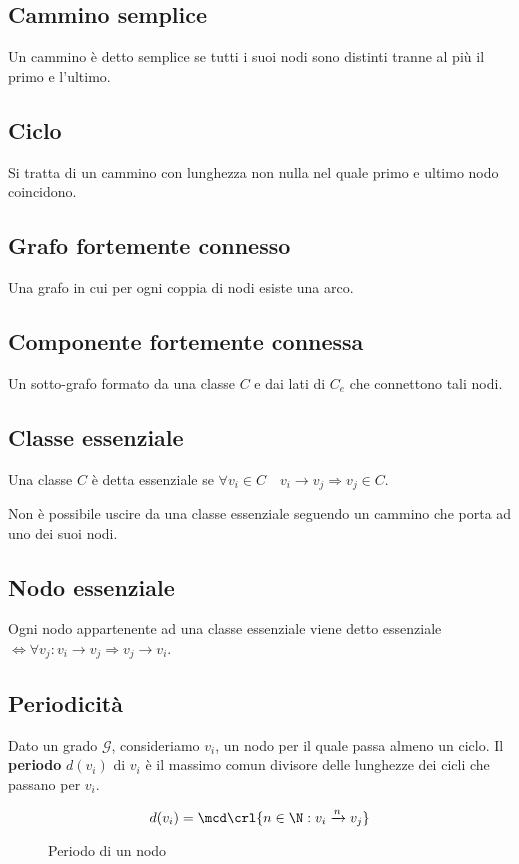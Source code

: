 \documentclass[\main/main.tex]{subfiles}
\begin{document}
\subsection{Cammino semplice}
Un cammino è detto semplice se tutti i suoi nodi sono distinti tranne al più il primo e l'ultimo.

\subsection{Ciclo}
Si tratta di un cammino con lunghezza non nulla nel quale primo e ultimo nodo coincidono.

\subsection{Grafo fortemente connesso}
Una grafo in cui per ogni coppia di nodi esiste una arco.

\subsection{Componente fortemente connessa}
Un sotto-grafo formato da una classe \(C\) e dai lati di \(C_e\) che connettono tali nodi.

\subsection{Classe essenziale}
Una classe \(C\) è detta essenziale se \(\forall v_i \in C \quad v_i \rightarrow v_j \Rightarrow v_j \in C\).

Non è possibile uscire da una classe essenziale seguendo un cammino che porta ad uno dei suoi nodi.

\subsection{Nodo essenziale}
Ogni nodo appartenente ad una classe essenziale viene detto essenziale \(\Leftrightarrow \forall v_j: v_i \rightarrow v_j \Rightarrow v_j \rightarrow v_i\).

\subsection{Periodicità}
Dato un grado \(\mathcal{G}\), consideriamo \(v_i\), un nodo per il quale passa almeno un ciclo. Il \textbf{periodo} \(d(v_i)\) di \(v_i\) è il massimo comun divisore delle lunghezze dei cicli che passano per \(v_i\).

\begin{figure}
  \[
    d(v_i) = \mcd\crl{n \in \N: v_i\xrightarrow{n}v_j}
  \]
  \caption{Periodo di un nodo}
\end{figure}
\end{document}
